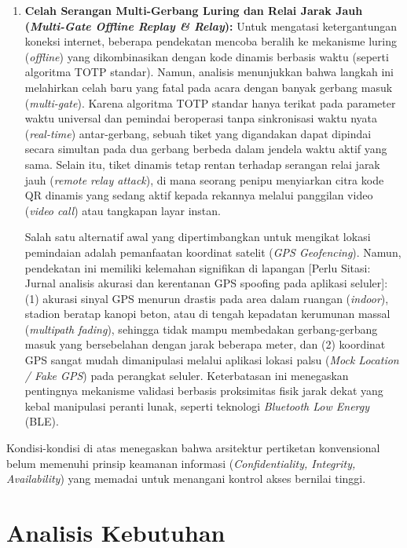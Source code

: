 \begin{enumerate}
    \item \textbf{Celah Serangan Multi-Gerbang Luring dan Relai Jarak Jauh (\textit{Multi-Gate Offline Replay \& Relay}):}
    Untuk mengatasi ketergantungan koneksi internet, beberapa pendekatan mencoba beralih ke mekanisme luring (\textit{offline}) yang dikombinasikan dengan kode dinamis berbasis waktu (seperti algoritma TOTP standar). Namun, analisis menunjukkan bahwa langkah ini melahirkan celah baru yang fatal pada acara dengan banyak gerbang masuk (\textit{multi-gate}). Karena algoritma TOTP standar hanya terikat pada parameter waktu universal dan pemindai beroperasi tanpa sinkronisasi waktu nyata (\textit{real-time}) antar-gerbang, sebuah tiket yang digandakan dapat dipindai secara simultan pada dua gerbang berbeda dalam jendela waktu aktif yang sama. Selain itu, tiket dinamis tetap rentan terhadap serangan relai jarak jauh (\textit{remote relay attack}), di mana seorang penipu menyiarkan citra kode QR dinamis yang sedang aktif kepada rekannya melalui panggilan video (\textit{video call}) atau tangkapan layar instan. 

    Salah satu alternatif awal yang dipertimbangkan untuk mengikat lokasi pemindaian adalah pemanfaatan koordinat satelit (\textit{GPS Geofencing}). Namun, pendekatan ini memiliki kelemahan signifikan di lapangan [Perlu Sitasi: Jurnal analisis akurasi dan kerentanan GPS spoofing pada aplikasi seluler]: (1) akurasi sinyal GPS menurun drastis pada area dalam ruangan (\textit{indoor}), stadion beratap kanopi beton, atau di tengah kepadatan kerumunan massal (\textit{multipath fading}), sehingga tidak mampu membedakan gerbang-gerbang masuk yang bersebelahan dengan jarak beberapa meter, dan (2) koordinat GPS sangat mudah dimanipulasi melalui aplikasi lokasi palsu (\textit{Mock Location / Fake GPS}) pada perangkat seluler. Keterbatasan ini menegaskan pentingnya mekanisme validasi berbasis proksimitas fisik jarak dekat yang kebal manipulasi peranti lunak, seperti teknologi \textit{Bluetooth Low Energy} (BLE).
\end{enumerate}

Kondisi-kondisi di atas menegaskan bahwa arsitektur pertiketan konvensional belum memenuhi prinsip keamanan informasi (\textit{Confidentiality, Integrity, Availability}) yang memadai untuk menangani kontrol akses bernilai tinggi.

\section{Analisis Kebutuhan}
\label{sec:analisis_kebutuhan}


